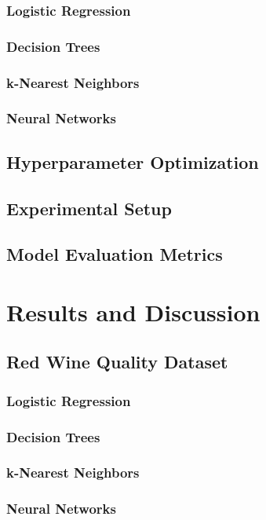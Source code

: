 \documentclass[conference]{IEEEtran}
\begin{document}
\subsubsection{Logistic Regression}
\subsubsection{Decision Trees}
\subsubsection{k-Nearest Neighbors}
\subsubsection{Neural Networks}

\subsection{Hyperparameter Optimization}

\subsection{Experimental Setup}
\subsection{Model Evaluation Metrics}


\section{Results and Discussion}
\subsection{Red Wine Quality Dataset}
\subsubsection{Logistic Regression}
\subsubsection{Decision Trees}
\subsubsection{k-Nearest Neighbors}
\subsubsection{Neural Networks}
\end{document}
